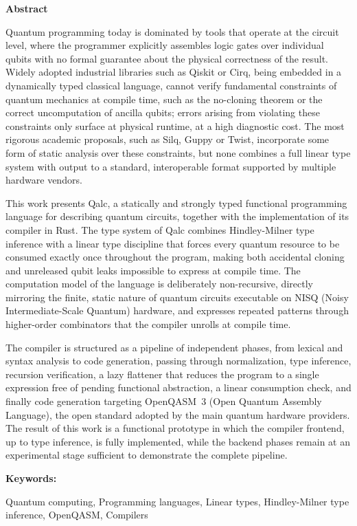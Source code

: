 \documentclass[a4paper,12pt,oneside]{scrbook}
\numberwithin{equation}{chapter}
\newenvironment{abstract}[1][\abstractname]{
    \cleardoublepageusingstyle{empty}
    \thispagestyle{empty}
    \begin{center}\textbf{#1}\end{center}
    \begin{itshape}\par\noindent%
}
{\end{itshape}}
\newenvironment{keywords}[1][Keywords]
{\vspace{7pt}\par\noindent\textup{\textbf{#1: }}\begin{upshape}}
{\end{upshape}}
\begin{document}
\begin{abstract}[Abstract]
Quantum programming today is dominated by tools that operate at the circuit level, where the programmer explicitly assembles logic gates over individual qubits with no formal guarantee about the physical correctness of the result. Widely adopted industrial libraries such as Qiskit or Cirq, being embedded in a dynamically typed classical language, cannot verify fundamental constraints of quantum mechanics at compile time, such as the no-cloning theorem or the correct uncomputation of ancilla qubits; errors arising from violating these constraints only surface at physical runtime, at a high diagnostic cost. The most rigorous academic proposals, such as Silq, Guppy or Twist, incorporate some form of static analysis over these constraints, but none combines a full linear type system with output to a standard, interoperable format supported by multiple hardware vendors.

This work presents Qalc, a statically and strongly typed functional programming language for describing quantum circuits, together with the implementation of its compiler in Rust. The type system of Qalc combines Hindley-Milner type inference with a linear type discipline that forces every quantum resource to be consumed exactly once throughout the program, making both accidental cloning and unreleased qubit leaks impossible to express at compile time. The computation model of the language is deliberately non-recursive, directly mirroring the finite, static nature of quantum circuits executable on NISQ (Noisy Intermediate-Scale Quantum) hardware, and expresses repeated patterns through higher-order combinators that the compiler unrolls at compile time.

The compiler is structured as a pipeline of independent phases, from lexical and syntax analysis to code generation, passing through normalization, type inference, recursion verification, a lazy flattener that reduces the program to a single expression free of pending functional abstraction, a linear consumption check, and finally code generation targeting OpenQASM~3 (Open Quantum Assembly Language), the open standard adopted by the main quantum hardware providers. The result of this work is a functional prototype in which the compiler frontend, up to type inference, is fully implemented, while the backend phases remain at an experimental stage sufficient to demonstrate the complete pipeline.

\begin{keywords}
Quantum computing, Programming languages, Linear types, Hindley-Milner type inference, OpenQASM, Compilers
\end{keywords}
\end{abstract}
\end{document}
